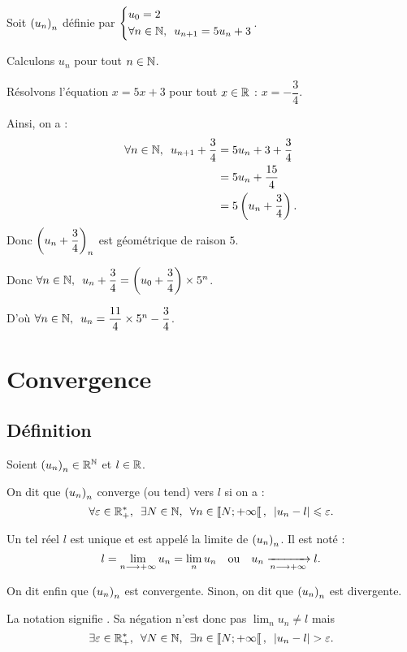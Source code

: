 \begin{ex}
Soit \(\left(u_n\right)_n\) définie par \(\begin{dcases}u_0=2 \\ \quantifs{\forall n\in\N}u_{n+1}=5u_n+3\end{dcases}\).

Calculons \(u_n\) pour tout \(n\in\mathbb{N}\).

Résolvons l'équation \(x=5x+3\) pour tout \(x\in\mathbb{R}\) : \(x=-\dfrac{3}{4}\).

Ainsi, on a : \[\begin{aligned}
\quantifs{\forall n\in\N}u_{n+1}+\dfrac{3}{4}&=5u_n+3+\dfrac{3}{4} \\
&=5u_n+\dfrac{15}{4} \\
&=5\paren{u_n+\dfrac{3}{4}}.
\end{aligned}\] Donc \(\left(u_n+\dfrac{3}{4}\right)_n\) est géométrique de raison \(5\).

Donc \(\quantifs{\forall n\in\N}u_n+\dfrac{3}{4}=\paren{u_0+\dfrac{3}{4}}\times5^n\).

D'où \(\quantifs{\forall n\in\N}u_n=\dfrac{11}{4}\times5^n-\dfrac{3}{4}\).
\end{ex}

\section{Convergence}

\subsection{Définition}

\begin{defprop}
Soient \(\left(u_n\right)_n\in\mathbb{R}^{\mathbb{N}}\) et \(l\in\mathbb{R}\).

On dit que \(\left(u_n\right)_n\) converge (ou tend) vers \(l\) si on a : \[\quantifs{\forall\epsilon\in\Rps;\exists N\in\N;\forall n\in\interventierie{N}{\pinf}}\abs{u_n-l}\leq\epsilon.\]

Un tel réel \(l\) est unique et est appelé la limite de \(\left(u_n\right)_n\). Il est noté : \[l=\lim_{n\longrightarrow+\infty}u_n=\lim_nu_n\quad\text{ou}\quad u_n\xrightarrow[n\longrightarrow+\infty]{}l.\]

On dit enfin que \(\left(u_n\right)_n\) est convergente. Sinon, on dit que \(\left(u_n\right)_n\) est divergente.
\end{defprop}

\begin{rem}
La notation  signifie . Sa négation n'est donc pas \(\lim_nu_n\not=l\) mais \[\quantifs{\exists\epsilon\in\Rps;\forall N\in\N;\exists n\in\interventierie{N}{\pinf}}\abs{u_n-l}>\epsilon.\]
\end{rem}

